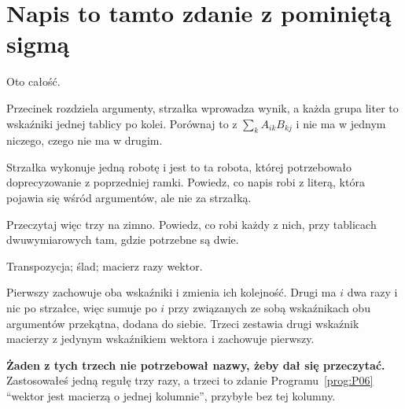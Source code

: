 \section{Napis \texorpdfstring{}{einsum} to tamto zdanie z pominiętą sigmą}
\label{sec:P07-einsum}

\begin{fr}
Oto całość.

\begin{center}
\end{center}

Przecinek rozdziela argumenty, strzałka wprowadza wynik, a każda grupa liter to
wskaźniki jednej tablicy po kolei. Porównaj to z $\sum_k A_{ik} B_{kj}$ i nie
ma w jednym niczego, czego nie ma w drugim.

Strzałka wykonuje jedną robotę i jest to ta robota, której potrzebowało
doprecyzowanie z poprzedniej ramki. Powiedz, co napis robi z literą, która
pojawia się wśród argumentów, ale nie za strzałką.
\dotline
\nextframe
\end{fr}

\begin{fr}
Przeczytaj więc trzy na zimno. Powiedz, co robi każdy z nich, przy tablicach
dwuwymiarowych tam, gdzie potrzebne są dwie.

\begin{center}
 \qquad {} \qquad {}
\end{center}
\dotline
\nextframe
\end{fr}

\begin{fr}
\begin{ansblock}
Transpozycja; ślad; macierz razy wektor.
\end{ansblock}

Pierwszy zachowuje oba wskaźniki i zmienia ich kolejność. Drugi ma $i$ dwa razy
i nic po strzałce, więc sumuje po $i$ przy związanych ze sobą wskaźnikach obu
argumentów \dash{} przekątna, dodana do siebie. Trzeci zestawia drugi wskaźnik
macierzy z jedynym wskaźnikiem wektora i zachowuje pierwszy.

\textbf{Żaden z tych trzech nie potrzebował nazwy, żeby dał się przeczytać.}
Zastosowałeś jedną regułę trzy razy, a trzeci to zdanie
Programu~\ref{prog:P06} \enquote{wektor jest macierzą o jednej kolumnie},
przybyłe bez tej kolumny.
\end{fr}

